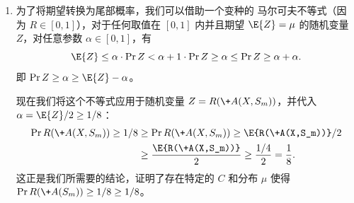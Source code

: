 \begin{solution}
\begin{enumerate}
        \item 为了将期望转换为尾部概率，我们可以借助一个变种的 马尔可夫不等式（因为 $R \in [0, 1]$），对于任何取值在 $[0, 1]$ 内并且期望 $\E{Z} = \mu$ 的随机变量 $Z$，对任意参数 $\alpha \in [0, 1]$，有
        \[
            \E{Z} \le \alpha \cdot \Pr{Z < \alpha} + 1 \cdot \Pr{Z \ge \alpha} \le \Pr{Z \ge \alpha} + \alpha.
        \]
        即 $\Pr{Z \ge \alpha} \ge \E{Z} - \alpha$。

        \noindent 现在我们将这个不等式应用于随机变量 $Z = R(\+A(X,S_m))$，并代入 $\alpha = \E{Z}/2 \ge 1/8$：
        \begin{align*}
            \Pr{R(\+A(X,S_m)) \ge 1/8} &\ge \Pr{R(\+A(X,S_m)) \ge \E{R(\+A(X,S_m))}/2}\\
            &\ge \frac{\E{R(\+A(X,S_m))}}{2} \ge \frac{1/4}{2} = \frac{1}{8}.
        \end{align*}
        这正是我们所需要的结论，证明了存在特定的 $C$ 和分布 $\mu$ 使得 $\Pr{R(\+A(S_m)) \ge 1/8} \ge 1/8$。
    \end{enumerate}
\end{solution}

